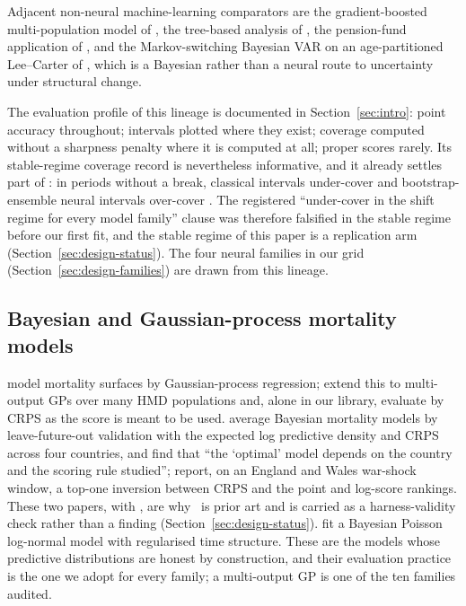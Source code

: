 Adjacent non-neural machine-learning comparators are the gradient-boosted
multi-population model of \citet{miao2025gradient}, the tree-based analysis
of \citet{deprez2017machine}, the pension-fund application of
\citet{demelo2025actuarial}, and the Markov-switching Bayesian VAR on an
age-partitioned Lee--Carter of \citet{fu2025applying}, which is a Bayesian
rather than a neural route to uncertainty under structural change.

The evaluation profile of this lineage is documented in
Section~\ref{sec:intro}: point accuracy throughout; intervals plotted where
they exist; coverage computed without a sharpness penalty where it is
computed at all; proper scores rarely. Its stable-regime coverage record is
nevertheless informative, and it already settles part of \Htwo: in periods
without a break, classical intervals under-cover and bootstrap-ensemble
neural intervals over-cover \citep{schnurch2022point,marino2023neural}. The
registered ``under-cover in the shift regime for every model family''
clause was therefore falsified
in the stable regime before our first fit, and the stable regime of this
paper is a replication arm (Section~\ref{sec:design-status}). The four
neural families in our grid (Section~\ref{sec:design-families}) are drawn
from this lineage.

\subsection{Bayesian and Gaussian-process mortality models}

\citet{ludkovski2018gaussian} model mortality surfaces by Gaussian-process
regression; \citet{huynh2021multi} extend this to multi-output GPs over many
HMD populations and, alone in our library, evaluate by CRPS as the score is
meant to be used. \citet{barigou2023bayesian} average Bayesian mortality
models by leave-future-out validation with the expected log predictive
density and CRPS across four countries, and find that ``the `optimal' model
depends on the country and the scoring rule studied'';
\citet{goes2025bayesian} report, on an England and Wales war-shock window,
a top-one inversion between CRPS and the point and log-score rankings.
These two papers, with \citet{schnurch2022point}, are why \Hone\ is prior
art and is carried as a harness-validity check rather than a finding
(Section~\ref{sec:design-status}). \citet{liu2020bayesian} fit a Bayesian
Poisson log-normal model with regularised time structure. These are the
models whose predictive distributions are honest by construction, and their
evaluation practice is the one we adopt for every family; a multi-output GP
is one of the ten families audited.

